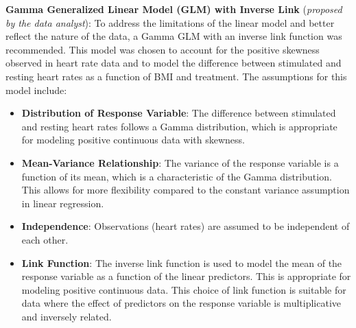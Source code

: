 \documentclass[10pt, a4paper]{article}
\begin{document}
\textbf{Gamma Generalized Linear Model (GLM) with Inverse Link} (\textit{proposed by the data analyst}): To address the limitations of the linear model and better reflect the nature of the data, a Gamma GLM with an inverse link function was recommended. This model was chosen to account for the positive skewness observed in heart rate data and to model the difference between stimulated and resting heart rates as a function of BMI and treatment. The assumptions for this model include:
\begin{itemize}
  \item \textbf{Distribution of Response Variable}: The difference between stimulated and resting heart rates follows a Gamma distribution, which is appropriate for modeling positive continuous data with skewness.
  \item \textbf{Mean-Variance Relationship}: The variance of the response variable is a function of its mean, which is a characteristic of the Gamma distribution. This allows for more flexibility compared to the constant variance assumption in linear regression.
  \item \textbf{Independence}: Observations (heart rates) are assumed to be independent of each other.
  \item \textbf{Link Function}: The inverse link function is used to model the mean of the response variable as a function of the linear predictors. This is appropriate for modeling positive continuous data. This choice of link function is suitable for data where the effect of predictors on the response variable is multiplicative and inversely related.
\end{itemize}
\end{document}
